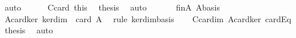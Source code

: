 \begin{isabellebody}
\ auto\isanewline
\ \ \ \ \isamarkupfalse%
\ C{\isacharprime}{\isacharunderscore}card\ this\ \isamarkupfalse%
\ {\isacharquery}thesis\ \isamarkupfalse%
\ auto\isanewline
\ \ \isamarkupfalse%
\isanewline
\ \ \isamarkupfalse%
\ finA\ Abasis\ \isamarkupfalse%
\ A{\isacharunderscore}card{\isacharunderscore}ker{\isacharcolon}\ {\isachardoublequoteopen}ker{\isachardot}dim\ {\isacharequal}\ card\ A{\isachardoublequoteclose}\ \isamarkupfalse%
\ {\isacharparenleft}rule\ ker{\isachardot}dim{\isacharunderscore}basis{\isacharparenright}\isanewline
\ \ \isamarkupfalse%
\ C{\isacharunderscore}card{\isacharunderscore}im\ A{\isacharunderscore}card{\isacharunderscore}ker\ cardEq\ \isamarkupfalse%
\ {\isacharquery}thesis\ \isamarkupfalse%
\ auto\isanewline
{}\isamarkupfalse%
%
\endisatagproof
{\isafoldproof}%
%
\isadelimproof
\isanewline
%
\endisadelimproof
\isanewline
\isanewline
%
\isadelimtheory
\isanewline
%
\endisadelimtheory
%
\isatagtheory
{}\isamarkupfalse%
%
\endisatagtheory
{\isafoldtheory}%
%
\isadelimtheory
%
\endisadelimtheory
\end{isabellebody}%
